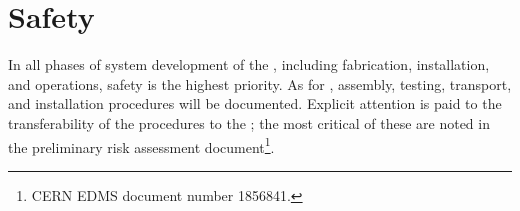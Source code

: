 \section{Safety}
\label{sec:fddp-hv-safety}



%

%

In all phases of  system development of the \dpmod, including fabrication, installation, and operations, safety is the highest priority.  %
As for , assembly, testing, transport, and installation procedures will be documented. Explicit attention is paid to the transferability of the  procedures to the \dpmod; the most critical of these are noted in the preliminary   risk assessment document\footnote{CERN EDMS document number 1856841.}.

